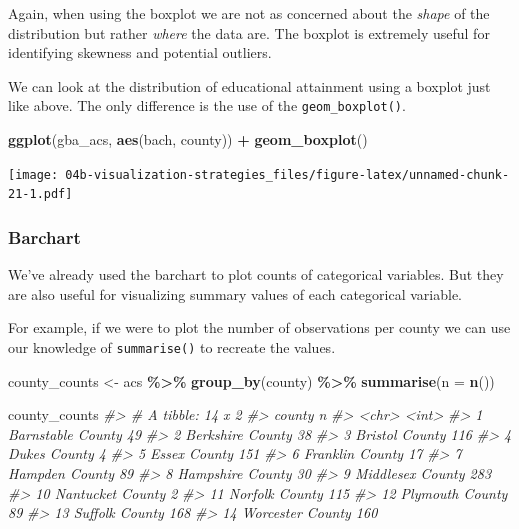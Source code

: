 \documentclass[
]{book}
\newenvironment{Shaded}{\begin{snugshade}}{\end{snugshade}}
\newcommand{\CommentTok}[1]{\textcolor[rgb]{0.56,0.35,0.01}{\textit{#1}}}
\newcommand{\DataTypeTok}[1]{\textcolor[rgb]{0.13,0.29,0.53}{#1}}
\newcommand{\KeywordTok}[1]{\textcolor[rgb]{0.13,0.29,0.53}{\textbf{#1}}}
\newcommand{\NormalTok}[1]{#1}
\newcommand{\OperatorTok}[1]{\textcolor[rgb]{0.81,0.36,0.00}{\textbf{#1}}}
\newcommand{\StringTok}[1]{\textcolor[rgb]{0.31,0.60,0.02}{#1}}
\begin{document}
Again, when using the boxplot we are not as concerned about the \emph{shape} of the distribution but rather \emph{where} the data are. The boxplot is extremely useful for identifying skewness and potential outliers.

We can look at the distribution of educational attainment using a boxplot just like above. The only difference is the use of the \texttt{geom\_boxplot()}.

\begin{Shaded}
\begin{Highlighting}[]
\KeywordTok{ggplot}\NormalTok{(gba\_acs, }\KeywordTok{aes}\NormalTok{(bach, county)) }\OperatorTok{+}
\StringTok{  }\KeywordTok{geom\_boxplot}\NormalTok{()}
\end{Highlighting}
\end{Shaded}

\texttt{[image: 04b-visualization-strategies\_files/figure-latex/unnamed-chunk-21-1.pdf]}

\hypertarget{barchart-1}{%
\subsubsection{Barchart}\label{barchart-1}}

We've already used the barchart to plot counts of categorical variables. But they are also useful for visualizing summary values of each categorical variable.

For example, if we were to plot the number of observations per county we can use our knowledge of \texttt{summarise()} to recreate the values.

\begin{Shaded}
\begin{Highlighting}[]
\NormalTok{county\_counts \textless{}{-}}\StringTok{ }\NormalTok{acs }\OperatorTok{\%\textgreater{}\%}\StringTok{ }
\StringTok{  }\KeywordTok{group\_by}\NormalTok{(county) }\OperatorTok{\%\textgreater{}\%}\StringTok{ }
\StringTok{  }\KeywordTok{summarise}\NormalTok{(}\DataTypeTok{n =} \KeywordTok{n}\NormalTok{())}

\NormalTok{county\_counts}
\CommentTok{\#\textgreater{} \# A tibble: 14 x 2}
\CommentTok{\#\textgreater{}    county                n}
\CommentTok{\#\textgreater{}    \textless{}chr\textgreater{}             \textless{}int\textgreater{}}
\CommentTok{\#\textgreater{}  1 Barnstable County    49}
\CommentTok{\#\textgreater{}  2 Berkshire County     38}
\CommentTok{\#\textgreater{}  3 Bristol County      116}
\CommentTok{\#\textgreater{}  4 Dukes County          4}
\CommentTok{\#\textgreater{}  5 Essex County        151}
\CommentTok{\#\textgreater{}  6 Franklin County      17}
\CommentTok{\#\textgreater{}  7 Hampden County       89}
\CommentTok{\#\textgreater{}  8 Hampshire County     30}
\CommentTok{\#\textgreater{}  9 Middlesex County    283}
\CommentTok{\#\textgreater{} 10 Nantucket County      2}
\CommentTok{\#\textgreater{} 11 Norfolk County      115}
\CommentTok{\#\textgreater{} 12 Plymouth County      89}
\CommentTok{\#\textgreater{} 13 Suffolk County      168}
\CommentTok{\#\textgreater{} 14 Worcester County    160}
\end{Highlighting}
\end{Shaded}
\end{document}
